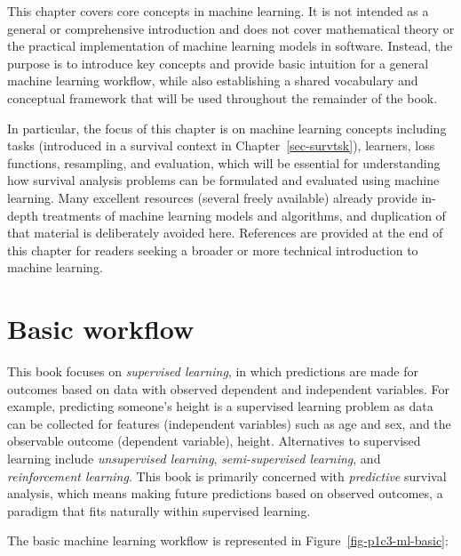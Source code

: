 \documentclass[
  letterpaper,
  krantz2]{style/krantz}
\begin{document}
This chapter covers core concepts in machine
learning. It is not intended as a general or
comprehensive introduction and does not cover mathematical theory or the
practical implementation of machine learning models in software.
Instead, the purpose is to introduce key concepts and provide basic
intuition for a general machine learning workflow, while also
establishing a shared vocabulary and conceptual framework that will be
used throughout the remainder of the book.

In particular, the focus of this chapter is on machine learning concepts
including tasks (introduced in a survival
context in Chapter~\ref{sec-survtsk}), learners, loss
functions, resampling, and
evaluation, which will be essential for
understanding how survival analysis problems can be formulated and
evaluated using machine learning. Many excellent resources (several
freely available) already provide in-depth treatments of machine
learning models and algorithms, and duplication of that material is
deliberately avoided here. References are provided at the end of this
chapter for readers seeking a broader or more technical introduction to
machine learning.

\section{Basic workflow}\label{sec-ml-basics}

This book focuses on \emph{supervised
learning}, in which predictions are made for
outcomes based on data with observed dependent and independent
variables. For example, predicting someone's height is a supervised
learning problem as data can be collected for features (independent
variables) such as age and sex, and the observable outcome (dependent
variable), height. Alternatives to supervised learning include
\emph{unsupervised learning},
\emph{semi-supervised learning}, and
\emph{reinforcement learning}. This book
is primarily concerned with \emph{predictive} survival analysis, which
means making future predictions based on observed outcomes, a paradigm
that fits naturally within supervised learning.

The basic machine learning workflow is represented in
Figure~\ref{fig-p1c3-ml-basic}:
\end{document}
